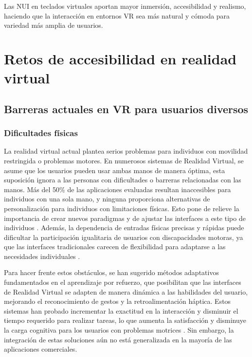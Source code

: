 Las NUI en teclados virtuales aportan mayor inmersión, accesibilidad y realismo, haciendo que la interacción en entornos VR sea más natural y cómoda para variedad más amplia de usuarios.

\section{Retos de accesibilidad en realidad virtual}

\subsection{Barreras actuales en VR para usuarios diversos}

\subsubsection{Dificultades físicas}

La realidad virtual actual plantea serios problemas para individuos con movilidad restringida o problemas motores. En numerosos sistemas de Realidad Virtual, se asume que los usuarios pueden usar ambas manos de manera óptima, esta suposición ignora a las personas con dificultades o barreras relacionadas con las manos. Más del 50\% de las aplicaciones evaluadas resultan inaccesibles para individuos con una sola mano, y ninguna proporciona alternativas de personalización para individuos con limitaciones físicas. Esto pone de relieve la importancia de crear nuevos paradigmas y de ajustar las interfaces a este tipo de individuos \cite{two_hands_vr}.  Además, la dependencia de entradas físicas precisas y rápidas puede dificultar la participación igualitaria de usuarios con discapacidades motoras, ya que las interfaces tradicionales carecen de flexibilidad para adaptarse a las necesidades individuales \cite{reinforcement_learning_vr}\cite{analyzing_challenges}.

Para hacer frente estos obstáculos, se han sugerido métodos adaptativos fundamentados en el aprendizaje por refuerzo, que posibilitan que las interfaces de Realidad Virtual se adapten de manera dinámica a las habilidades del usuario, mejorando el reconocimiento de gestos y la retroalimentación háptica. Estos sistemas han probado incrementar la exactitud en la interacción y disminuir el tiempo requerido para realizar tareas, lo que aumenta la satisfacción y disminuye la carga cognitiva para los usuarios con problemas motrices \cite{reinforcement_learning_vr}. Sin embargo, la integración de estas soluciones aún no está generalizada en la mayoría de las aplicaciones comerciales.

